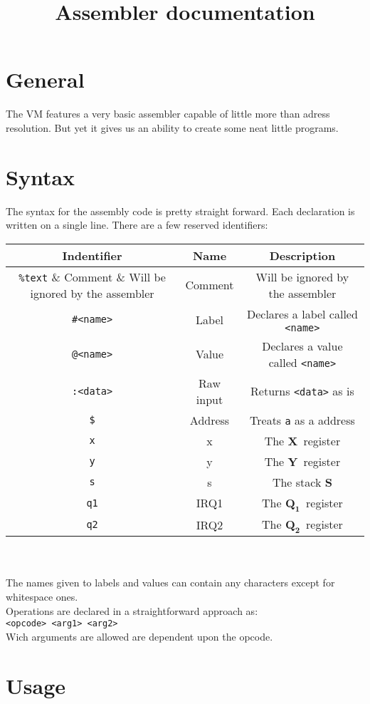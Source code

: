 \documentclass{article}
\newcommand{\V}{\verb}
\newcommand{\x}{$\textbf{X}$}
\newcommand{\y}{$\textbf{Y}$}
\newcommand{\s}{$\textbf{S}$}
\newcommand{\q}{$\textbf{Q}_{\textbf{1}}$}
\newcommand{\qq}{$\textbf{Q}_{\textbf{2}}$}
\begin{document}
\title{Assembler documentation}

\section{General}
The VM features a very basic assembler capable of little more than adress
resolution. But yet it gives us an ability to create some neat little programs.
\section{Syntax}
The syntax for the assembly code is pretty straight forward. Each declaration is
written on a single line. There are a few reserved identifiers:

\begin{tabular}{|c | c| c |}
\hline
Indentifier & Name & Description\\
\hline
\V+%
\hline
\V+#<name>+ & Label & Declares a label called \V+<name>+ \\
\hline
\V+@<name>+ & Value & Declares a value called \V+<name>+\\
\hline
\V+:<data>+ & Raw input & Returns \V+<data>+ as is \\
\hline
\verb+$+ & Address & Treats \V+a+ as a address \\
\hline
\V+x+ & x & The \x \ register \\
\hline
\V+y+ & y & The \y \ register \\
\hline
\V+s+ & s & The stack \s \\
\hline
\V+q1+ & IRQ1 & The \q \ register\\
\hline
\V+q2+ & IRQ2 & The \qq \ register\\
\hline
\end{tabular}
\\
\\
The names given to labels and values can contain any characters except for
whitespace ones.\\
Operations are declared in a straightforward approach as:\\
\V+<opcode> <arg1> <arg2>+ \\
Wich arguments are allowed are dependent upon the opcode.\\


\section{Usage}
\end{document}
